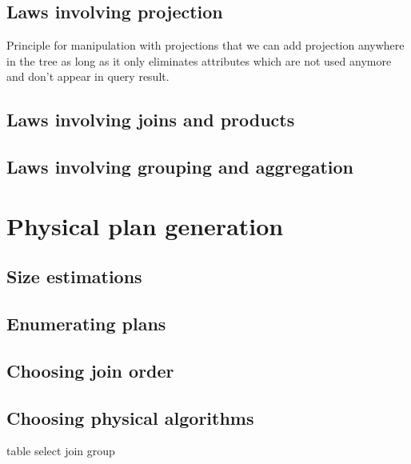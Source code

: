 \subsection{Laws involving projection}
Principle for manipulation with projections that we can add projection anywhere in the tree as long as it only eliminates attributes which are not used anymore and don't appear in query result.
\subsection{Laws involving joins and products}

\subsection{Laws involving grouping and aggregation}


\section{Physical plan generation}

\subsection{Size estimations}

\subsection{Enumerating plans}

\subsection{Choosing join order}

\subsection{Choosing physical algorithms}

table
select
join
group




